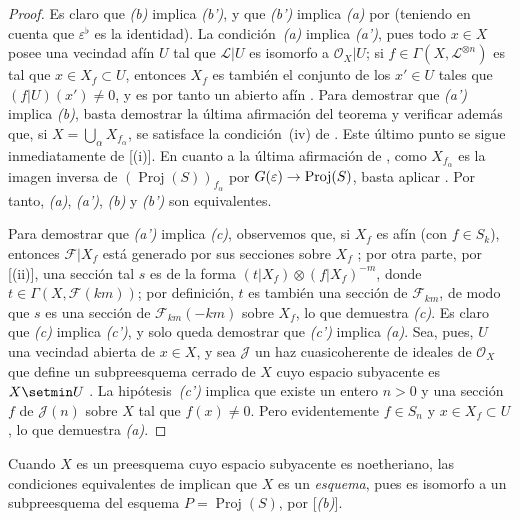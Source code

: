 \documentclass[oneside,10pt]{amsart}
\makeatletter
\newcommand{\ega@arrow}[2]{\mathchoice{#1}{#2}{#2}{#2}}
\renewcommand{\to}{\ega@arrow{\longrightarrow}{\rightarrow}}
\makeatother
\begin{document}
\begin{proof}
Es claro que \emph{(b)} implica \emph{(b')}, y que \emph{(b')} implica \emph{(a)} por  (teniendo en cuenta que $\varepsilon^\flat$ es la identidad).
La condición~\emph{(a)} implica \emph{(a')}, pues todo $x\in X$ posee una vecindad afín $U$ tal que $\mathcal{L}|U$ es isomorfo a $\mathcal{O}_X|U$;
si $f\in\Gamma(X,\mathcal{L}^{\otimes n})$ es tal que $x\in X_f\subset U$, entonces $X_f$ es también el conjunto de los $x'\in U$ tales que $(f|U)(x')\neq0$, y es por tanto un abierto afín .
Para demostrar que \emph{(a')} implica \emph{(b)}, basta demostrar la última afirmación del teorema y verificar además que, si $X=\bigcup_\alpha X_{f_\alpha}$, se satisface la condición~(iv) de .
Este último punto se sigue inmediatamente de [(i)].
En cuanto a la última afirmación de , como $X_{f_\alpha}$ es la imagen inversa de $(\operatorname{Proj}(S))_{f_\alpha}$ por $G(\varepsilon)\to\operatorname{Proj}(S)$, basta aplicar .
Por tanto, \emph{(a)}, \emph{(a')}, \emph{(b)} y \emph{(b')} son equivalentes.

Para demostrar que \emph{(a')} implica \emph{(c)}, observemos que, si $X_f$ es afín (con $f\in S_k$), entonces $\mathcal{F}|X_f$ está generado por sus secciones sobre $X_f$ ;
por otra parte, por [(ii)], una sección tal $s$ es de la forma $(t|X_f)\otimes(f|X_f)^{-m}$, donde $t\in\Gamma(X,\mathcal{F}(km))$;
por definición, $t$ es también una sección de $\mathcal{F}_{km}$, de modo que $s$ es una sección de $\mathcal{F}_{km}(-km)$ sobre $X_f$, lo que demuestra \emph{(c)}.
Es claro que \emph{(c)} implica \emph{(c')}, y solo queda demostrar que \emph{(c')} implica \emph{(a)}.
Sea, pues, $U$ una vecindad abierta de $x\in X$, y sea $\mathcal{J}$ un haz cuasicoherente de ideales de $\mathcal{O}_X$ que define un subpreesquema cerrado de $X$ cuyo espacio subyacente es $X\setmin U$ .
La hipótesis~\emph{(c')} implica que existe un entero $n>0$ y una sección $f$ de $\mathcal{J}(n)$ sobre $X$ tal que $f(x)\neq0$.
Pero evidentemente $f\in S_n$ y $x\in X_f\subset U$, lo que demuestra \emph{(a)}.
\end{proof}

Cuando $X$ es un preesquema cuyo espacio subyacente es noetheriano, las condiciones equivalentes de  implican que $X$ es un \emph{esquema}, pues es isomorfo a un subpreesquema del esquema $P=\operatorname{Proj}(S)$, por [\emph{(b)}].
\end{document}
